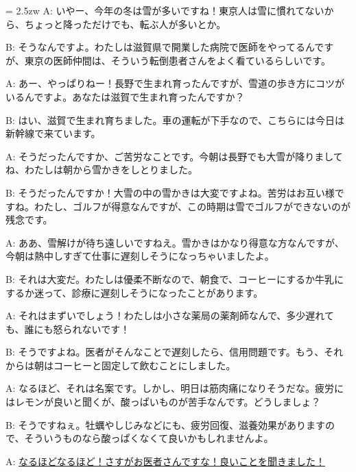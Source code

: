 \documentclass[11pt]{amsart}
\title{}
\author{}
\newenvironment{hangall}[1]{\hangindent = 2.5zw\everypar{\hangindent = 2.5zw}}{}
\begin{document}
\maketitle
\begin{hangall}{}%
A: いやー、今年の冬は雪が多いですね！東京人は雪に慣れてないから、ちょっと降っただけでも、転ぶ人が多いとか。

B: そうなんですよ。わたしは滋賀県で開業した病院で医師をやってるんですが、東京の医師仲間は、そういう転倒患者さんをよく看ているらしいです。

A: あー、やっぱりねー！長野で生まれ育ったんですが、雪道の歩き方にコツがいるんですよ。あなたは滋賀で生まれ育ったんですか？

B: はい、滋賀で生まれ育ちました。車の運転が下手なので、こちらには今日は新幹線で来ています。

A: そうだったんですか、ご苦労なことです。今朝は長野でも大雪が降りましてね、わたしは朝から雪かきをしとりました。

B: そうだったんですか！大雪の中の雪かきは大変ですよね。苦労はお互い様ですね。わたし、ゴルフが得意なんですが、この時期は雪でゴルフができないのが残念です。

A: ああ、雪解けが待ち遠しいですねえ。雪かきはかなり得意な方なんですが、今朝は熱中しすぎて仕事に遅刻しそうになっちゃいましたよ。

B: それは大変だ。わたしは優柔不断なので、朝食で、コーヒーにするか牛乳にするか迷って、診療に遅刻しそうになったことがあります。

A: それはまずいでしょう！わたしは小さな薬局の薬剤師なんで、多少遅れても、誰にも怒られないです！

B: そうですよね。医者がそんなことで遅刻したら、信用問題です。もう、それからは朝はコーヒーと固定して飲むことにしました。

A: なるほど、それは名案です。しかし、明日は筋肉痛になりそうだな。疲労にはレモンが良いと聞くが、酸っぱいものが苦手なんです。どうしましょ？

B: そうですねぇ。牡蠣やしじみなどにも、疲労回復、滋養効果がありますので、そういうものなら酸っぱくなくて良いかもしれませんよ。

A: \ul{なるほどなるほど！さすがお医者さんですな！良いことを聞きました！}\end{hangall}
\end{document}
